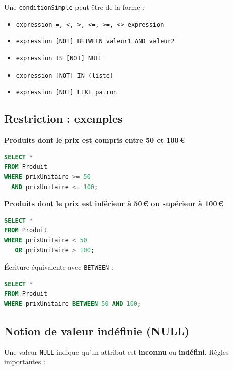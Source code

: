 Une \texttt{conditionSimple} peut être de la forme :

\begin{itemize}
    \item \texttt{expression =, <, >, <=, >=, <> expression}
    \item \texttt{expression [NOT] BETWEEN valeur1 AND valeur2}
    \item \texttt{expression IS [NOT] NULL}
    \item \texttt{expression [NOT] IN (liste)}
    \item \texttt{expression [NOT] LIKE patron}
\end{itemize}

\subsection{Restriction : exemples}

\textbf{Produits dont le prix est compris entre 50 et 100\,€}

\begin{sqlcodebox}
\begin{lstlisting}[language=SQL]
SELECT *
FROM Produit
WHERE prixUnitaire >= 50
  AND prixUnitaire <= 100;
\end{lstlisting}
\end{sqlcodebox}

\textbf{Produits dont le prix est inférieur à 50\,€ ou supérieur à 100\,€}

\begin{sqlcodebox}
\begin{lstlisting}[language=SQL]
SELECT *
FROM Produit
WHERE prixUnitaire < 50
   OR prixUnitaire > 100;
\end{lstlisting}
\end{sqlcodebox}

Écriture équivalente avec \texttt{BETWEEN} :

\begin{sqlcodebox}
\begin{lstlisting}[language=SQL]
SELECT *
FROM Produit
WHERE prixUnitaire BETWEEN 50 AND 100;
\end{lstlisting}
\end{sqlcodebox}

\subsection{Notion de valeur indéfinie (NULL)}

Une valeur \texttt{NULL} indique qu’un attribut est \textbf{inconnu} ou \textbf{indéfini}.  
Règles importantes :

